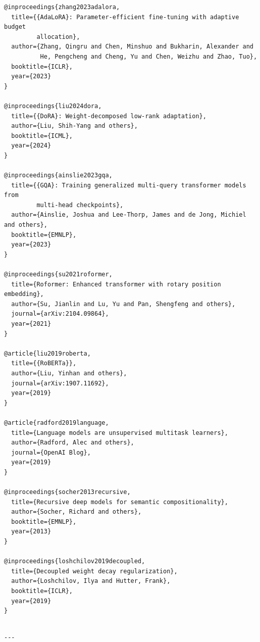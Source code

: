 \begin{lstlisting}
@inproceedings{zhang2023adalora,
  title={{AdaLoRA}: Parameter-efficient fine-tuning with adaptive budget 
         allocation},
  author={Zhang, Qingru and Chen, Minshuo and Bukharin, Alexander and 
          He, Pengcheng and Cheng, Yu and Chen, Weizhu and Zhao, Tuo},
  booktitle={ICLR},
  year={2023}
}

@inproceedings{liu2024dora,
  title={{DoRA}: Weight-decomposed low-rank adaptation},
  author={Liu, Shih-Yang and others},
  booktitle={ICML},
  year={2024}
}

@inproceedings{ainslie2023gqa,
  title={{GQA}: Training generalized multi-query transformer models from 
         multi-head checkpoints},
  author={Ainslie, Joshua and Lee-Thorp, James and de Jong, Michiel and others},
  booktitle={EMNLP},
  year={2023}
}

@inproceedings{su2021roformer,
  title={Roformer: Enhanced transformer with rotary position embedding},
  author={Su, Jianlin and Lu, Yu and Pan, Shengfeng and others},
  journal={arXiv:2104.09864},
  year={2021}
}

@article{liu2019roberta,
  title={{RoBERTa}},
  author={Liu, Yinhan and others},
  journal={arXiv:1907.11692},
  year={2019}
}

@article{radford2019language,
  title={Language models are unsupervised multitask learners},
  author={Radford, Alec and others},
  journal={OpenAI Blog},
  year={2019}
}

@inproceedings{socher2013recursive,
  title={Recursive deep models for semantic compositionality},
  author={Socher, Richard and others},
  booktitle={EMNLP},
  year={2013}
}

@inproceedings{loshchilov2019decoupled,
  title={Decoupled weight decay regularization},
  author={Loshchilov, Ilya and Hutter, Frank},
  booktitle={ICLR},
  year={2019}
}
\end{lstlisting}
\begin{lstlisting}

---
\end{lstlisting}